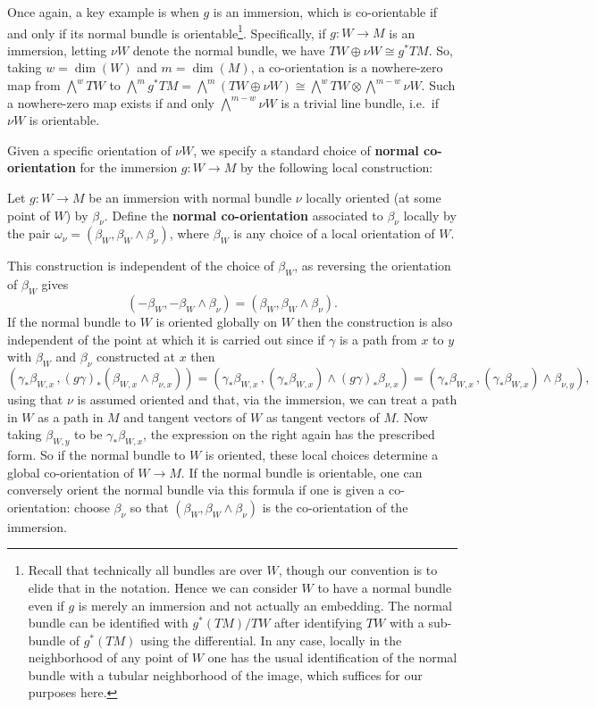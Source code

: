 Once again, a key example is when $g$ is an immersion, which is co-orientable if and only if its normal bundle is orientable\footnote{Recall that technically all bundles are over $W$, though our convention is to elide that in the notation.
Hence we can consider $W$ to have a normal bundle even if $g$ is merely an immersion and not actually an embedding.
The normal bundle can be identified with $g^*(TM)/TW$ after identifying $TW$ with a sub-bundle of $g^*(TM)$ using the differential.
In any case, locally in the neighborhood of any point of $W$ one has the usual identification of the normal bundle with a tubular neighborhood of the image, which suffices for our purposes here.}.
Specifically, if $g \colon W \to M$ is an immersion, letting $\nu W$ denote the normal bundle, we have $TW \oplus \nu W \cong g^*TM$.
So, taking $w = \dim(W)$ and $m = \dim(M)$, a co-orientation is a nowhere-zero map from $\bigwedge^w TW$ to $\bigwedge^m g^*TM = \bigwedge^m (TW \oplus \nu W) \cong \bigwedge^w TW \otimes \bigwedge^{m-w}\nu W$.
Such a nowhere-zero map exists if and only $\bigwedge^{m-w}\nu W$ is a trivial line bundle, i.e.\ if $\nu W$ is orientable.

Given a specific orientation of $\nu W$, we specify a standard choice of \textbf{normal co-orientation} for the immersion $g \colon W \to M$ by the following local construction:

\begin{definition}\label{normal co-or}
	Let $g \colon W \to M$ be an immersion with normal bundle $\nu$ locally oriented (at some point of $W$) by $\beta_\nu$.
	Define the \textbf{normal co-orientation} associated to $\beta_\nu$ locally by the pair $\omega_{\nu} = (\beta_W, \beta_W \wedge \beta_\nu)$, where $\beta_W$ is any choice of a local orientation of $W$.
\end{definition}

This construction is independent of the choice of $\beta_W$, as reversing the orientation of $\beta_W$ gives
$$(-\beta_W, -\beta_W \wedge \beta_\nu) = (\beta_W, \beta_W \wedge \beta_\nu).$$
If the normal bundle to $W$ is oriented globally on $W$ then the construction is also independent of the point at which it is carried out since if $\gamma$ is a path from $x$ to $y$ with $\beta_W$ and $\beta_\nu$ constructed at $x$ then
\begin{equation*}
	(\gamma_*\beta_{W,x}\, , (g\gamma)_* (\beta_{W,x} \wedge \beta_{\nu,x})) =
	(\gamma_*\beta_{W,x}\, , (\gamma_* \beta_{W,x}) \wedge (g\gamma)_*\beta_{\nu,x}) =
	(\gamma_*\beta_{W,x}\, , (\gamma_* \beta_{W,x}) \wedge \beta_{\nu,y}),
\end{equation*}
using that $\nu$ is assumed oriented and that, via the immersion, we can treat a path in $W$ as a path in $M$ and tangent vectors of $W$ as tangent vectors of $M$.
Now taking $\beta_{W,y}$ to be $\gamma_* \beta_{W,x}$, the expression on the right again has the prescribed form.
So if the normal bundle to $W$ is oriented, these local choices determine a global co-orientation of $W \to M$.
If the normal bundle is orientable, one can conversely orient the normal bundle via this formula if one is given a co-orientation: choose $\beta_\nu$ so that $(\beta_W, \beta_W \wedge \beta_\nu)$ is the co-orientation of the immersion.

